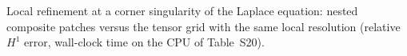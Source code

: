 \begin{table}[htbp]\centering\footnotesize\setlength{\tabcolsep}{4pt}
\caption{Local refinement at a corner singularity of the Laplace equation: nested composite patches
versus the tensor grid with the same local resolution (relative $H^1$ error, wall-clock time on the CPU of
Table~S20).}

\end{table}
